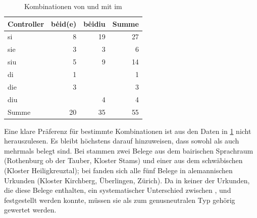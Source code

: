 \begin{table}
\centering
\caption{Kombinationen von  und  mit  im
\CAO{}}
\begin{tabular}{
	l
	r r
	r
}
\toprule
\textbf{Controller}
	& \textbf{bėid(e)}
	& \textbf{bėidiu}
	& \textbf{Summe}
	\\

\midrule

si    &  8 & 19 & 27 \\
sie   &  3 &  3 &  6 \\
siu   &  5 &  9 & 14 \\

\midrule

di    &  1 &    &  1 \\
die   &  3 &    &  3 \\
diu   &    &  4 &  4 \\

\midrule

Summe & 20 & 35 & 55 \\
\bottomrule
\end{tabular}
\label{tab:caosiebeidekombis}
\end{table}

Eine klare Präferenz für bestimmte Kombinationen ist aus den Daten in
\cref{tab:caosiebeidekombis} nicht herauszulesen. Es bleibt höchstens darauf
hinzuweisen, dass sowohl 
als auch 
mehrmals belegt sind. Bei  stammen zwei Belege aus dem
bairischen Sprachraum (Rothenburg ob der Tauber, Kloster Stams) und einer aus
dem schwäbischen (Kloster Heiligkreuztal); bei  fanden sich
alle fünf Belege in alemannischen Urkunden (Kloster Kirchberg, Überlingen,
Zürich). Da in keiner der Urkunden, die diese Belege enthalten, ein
systematischer Unterschied zwischen ,  und
 festgestellt werden konnte, müssen sie als zum genusneutralen Typ
 gehörig gewertet werden.


